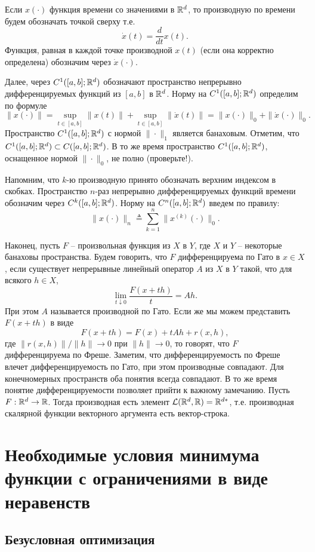 \documentclass[a4paper,12pt]{report}
\begin{document}
Если $x(\cdot)$ функция времени со значениями в $\mathbb{R}^d$, то производную по времени будем обозначать точкой сверху т.е.
$$\dot{x}(t)=\frac{d}{dt}x(t). $$ Функция, равная в каждой точке производной $x(t)$ (если она корректно определена) обозначим через $\dot{x}(\cdot)$.

Далее, через $C^1([a,b];\mathbb{R}^d)$ обозначают пространство непрерывно дифференцируемых функций из $[a,b]$ в $\mathbb{R}^d$. Норму на $C^1([a,b];\mathbb{R}^d)$ определим по формуле
$$\|x(\cdot)\|=\sup_{t\in [a,b]}\|x(t)\|+\sup_{t\in [a,b]}\|\dot{x}(t)\|=\|x(\cdot)\|_0+\|\dot{x}(\cdot)\|_0. $$ Пространство $C^1([a,b];\mathbb{R}^d)$ с нормой $\|\cdot\|_1$ является банаховым. Отметим, что $C^1([a,b];\mathbb{R}^d)\subset C([a,b];\mathbb{R}^d)$. В то же время пространство $C^1([a,b];\mathbb{R}^d)$, оснащенное нормой $\|\cdot\|_0$, не полно (проверьте!).

Напомним, что $k$-ю производную принято обозначать верхним индексом в скобках. Пространство $n$-раз непрерывно дифференцируемых функций времени обозначим через $C^k([a,b];\mathbb{R}^d)$. Норму на $C^n([a,b];\mathbb{R}^d)$ введем по правилу:
$$\|x(\cdot)\|_n\triangleq \sum_{k=1}^n \|x^{(k)}(\cdot)\|_0. $$

Наконец, пусть $F$ -- произвольная функция из $X$ в $Y$, где $X$ и $Y$ -- некоторые банаховы пространства. Будем говорить, что $F$ дифференцируема по Гато в $x\in X$, если существует непрерывные линейный оператор $A$ из $X$ в $Y$ такой, что для всякого $h\in X$,
$$\lim_{t\downarrow 0}\frac{F(x+t h)}{t}=Ah. $$ При этом $A$ называется производной по Гато. Если же мы можем представить $F(x+th)$ в виде
$$F(x+th)=F(x)+tAh+r(x,h), $$ где $\|r(x,h)\|/\|h\|\rightarrow 0$ при $\|h\|\rightarrow 0$, то говорят, что $F$ дифференцируема по Фреше. Заметим, что дифференцируемость по Фреше влечет дифференцируемость по Гато, при этом производные совпадают. Для конечномерных пространств оба понятия всегда совпадают. В то же время понятие дифференцируемости позволяет прийти к важному замечанию. Пусть $F:\mathbb{R}^d\rightarrow\mathbb{R}$. Тогда производная есть элемент $\mathcal{L}(\mathbb{R}^d,\mathbb{R})=\mathbb{R}^{d*}$, т.е. производная  скалярной функции векторного аргумента есть вектор-строка.

\chapter{Необходимые условия минимума функции с ограничениями в виде неравенств}
\section{Безусловная оптимизация}
\end{document}
